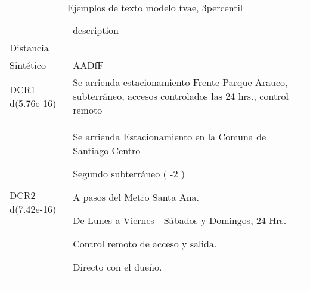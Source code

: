 \begin{table}[H]
\centering
\fontsize{10}{14}\selectfont
\caption{Ejemplos de texto modelo tvae, 3percentil}
\label{table-example-economicos-b-2-tvae-3p-text}
\begin{tabular}{|l|m{35em}|}
\hline
\rowcolor[gray]{0.8}
 & description \\
Distancia &  \\
\hline Sintético & AADfF \\
\hline DCR1 d(5.76e-16) & Se arrienda estacionamiento Frente Parque Arauco, subterr\'aneo, accesos controlados las 24 hrs., control remoto \\
\hline DCR2 d(7.42e-16) & Se arrienda Estacionamiento en la Comuna de Santiago Centro

Segundo subterr\'aneo ( -2 )

A pasos del Metro Santa Ana.


De Lunes a Viernes - S\'abados y Domingos, 24 Hrs.

Control remoto de acceso y salida.

Directo con el due\~no. \\
\hline
\end{tabular}
\end{table}
